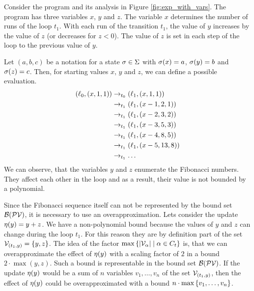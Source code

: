 \begin{example}
  
  Consider the program and its analysis in Figure \ref{fig:exp_with_vars}.  
  The program has three variables $x$, $y$ and $z$.
  The variable $x$ determines the number of runs of the loop $t_1$.
  With each run of the transition $t_1$, the value of $y$ increases by the value of $z$ (or decreases for $z < 0$).
  The value of $z$ is set in each step of the loop to the previous value of $y$.
  
  Let $(a,b,c)$ be a notation for a state $\sigma \in \Sigma$ with $\sigma(x) = a$, $\sigma(y) = b$ and $\sigma(z) = c$.
  Then, for starting values $x$, $y$ and $z$, we can define a possible evaluation.
  \begin{align*}
    (\ell_0, (x,1,1)) & \rightarrow_{t_0} (\ell_1, (x,1,1)) \\
    & \rightarrow_{t_1} (\ell_1, (x-1,2,1)) \\
    & \rightarrow_{t_1} (\ell_1, (x-2,3,2)) \\
    & \rightarrow_{t_1} (\ell_1, (x-3,5,3)) \\
    & \rightarrow_{t_1} (\ell_1, (x-4,8,5)) \\
    & \rightarrow_{t_1} (\ell_1, (x-5,13,8)) \\
    & \rightarrow_{t_1} \dots
  \end{align*}
  We can observe, that the variables $y$ and $z$ enumerate the Fibonacci numbers.
  They affect each other in the loop and as a result, their value is not bounded by a polynomial.
  
  Since the Fibonacci sequence itself can not be represented by the bound set $\mathcal{B}(\mathcal{PV})$, it is necessary to use an overapproximation.
  Lets consider the update $\eta(y) = y + z$.
  We have a non-polynomial bound because the values of $y$ and $z$ can change during the loop $t_1$.
  For this reason they are by definition part of the set $\mathcal{V}_{(t_1,y)} = \lbrace y,z \rbrace$.
  The idea of the factor $\max \left\lbrace \left|\mathcal{V}_\alpha\right| \mid \alpha \in C_t \right\rbrace$ is, that we can overapproximate the effect of $\eta(y)$ with a scaling factor of $2$ in a bound $2 \cdot \max(y,z)$.
  Such a bound is representable in the bound set $\mathcal{B}(\mathcal{PV})$.
  If the update $\eta(y)$ would be a sum of $n$ variables $v_1, \dots, v_n$ of the set $\mathcal{V}_{(t_1,y)}$, then the effect of $\eta(y)$ could be overapproximated with a bound $n \cdot \max \left\lbrace v_1, \dots, v_n \right\rbrace$.
\end{example}

